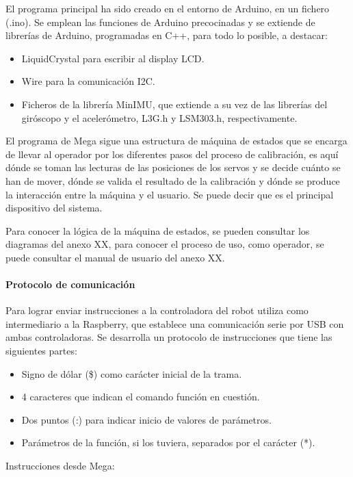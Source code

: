 El programa principal ha sido creado en el entorno de Arduino, en un fichero (.ino). Se emplean las funciones de Arduino precocinadas y se extiende de librerías de Arduino, programadas en C++, para todo lo posible, a destacar:
\begin{itemize}
  \item LiquidCrystal para escribir al display LCD.
  \item Wire para la comunicación I2C.
  \item Ficheros de la librería MinIMU, que extiende a su vez de las librerías del giróscopo y el acelerómetro, L3G.h y LSM303.h, respectivamente.
\end{itemize}

El programa de Mega sigue una estructura de máquina de estados que se encarga de llevar al operador por los diferentes pasos del proceso de calibración, es aquí dónde se toman las lecturas de las posiciones de los servos y se decide cuánto se han de mover, dónde se valida el resultado de la calibración y dónde se produce la interacción entre la máquina y el usuario. Se puede decir que es el principal dispositivo del sistema.

Para conocer la lógica de la máquina de estados, se pueden consultar los diagramas del anexo XX, para conocer el proceso de uso, como operador, se puede consultar el manual de usuario del anexo XX.

\paragraph{Protocolo de comunicación}

Para lograr enviar instrucciones a la controladora del robot utiliza como intermediario a la Raspberry, que establece una comunicación serie por USB con ambas controladoras. Se desarrolla un protocolo de instrucciones que tiene las siguientes partes:

\begin{itemize}
  \item Signo de dólar (\$) como carácter inicial de la trama.
  \item 4 caracteres que indican el comando función en cuestión.
  \item Dos puntos (:) para indicar inicio de valores de parámetros.
  \item Parámetros de la función, si los tuviera, separados por el carácter (*).
\end{itemize}

Instrucciones desde Mega:

